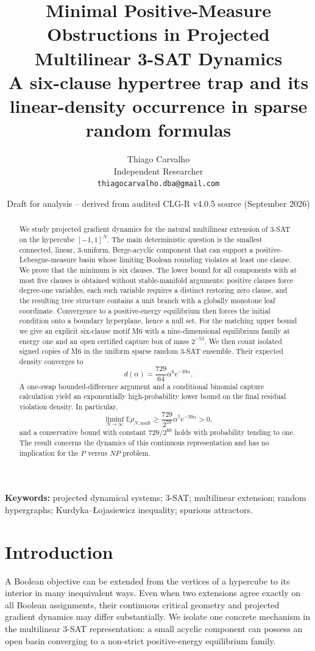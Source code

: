 \documentclass[11pt,a4paper]{article}
\title{Minimal Positive-Measure Obstructions in Projected Multilinear 3-SAT Dynamics\\\large A six-clause hypertree trap and its linear-density occurrence in sparse random formulas}
\author{Thiago Carvalho\\Independent Researcher\\\texttt{thiagocarvalho.dba@gmail.com}}
\date{Draft for analysis -- derived from audited CLG-R v4.0.5 source (September 2026)}
\begin{document}
\maketitle
\begin{abstract}
We study projected gradient dynamics for the natural multilinear extension of 3-SAT on the hypercube $[-1,1]^N$. The main deterministic question is the smallest connected, linear, 3-uniform, Berge-acyclic component that can support a positive-Lebesgue-measure basin whose limiting Boolean rounding violates at least one clause. We prove that the minimum is six clauses. The lower bound for all components with at most five clauses is obtained without stable-manifold arguments: positive clauses force degree-one variables, each such variable requires a distinct restoring zero clause, and the resulting tree structure contains a unit branch with a globally monotone leaf coordinate. Convergence to a positive-energy equilibrium then forces the initial condition onto a boundary hyperplane, hence a null set. For the matching upper bound we give an explicit six-clause motif M6 with a nine-dimensional equilibrium family at energy one and an open certified capture box of mass $2^{-53}$. We then count isolated signed copies of M6 in the uniform sparse random 3-SAT ensemble. Their expected density converges to
\[
d(\alpha)=\frac{729}{64}\alpha^6e^{-39\alpha}.
\]
A one-swap bounded-difference argument and a conditional binomial capture calculation yield an exponentially high-probability lower bound on the final residual violation density. In particular,
\[
\liminf_{N\to\infty}\mathbb E\rho_{N,\mathrm{mult}}\ge \frac{729}{2^{59}}\alpha^5e^{-39\alpha}>0,
\]
and a conservative bound with constant $729/2^{60}$ holds with probability tending to one. The result concerns the dynamics of this continuous representation and has no implication for the $P$ versus $NP$ problem.
\end{abstract}
\noindent\textbf{Keywords:} projected dynamical systems; 3-SAT; multilinear extension; random hypergraphs; Kurdyka--\L{}ojasiewicz inequality; spurious attractors.

\section{Introduction}
A Boolean objective can be extended from the vertices of a hypercube to its interior in many inequivalent ways. Even when two extensions agree exactly on all Boolean assignments, their continuous critical geometry and projected gradient dynamics may differ substantially. We isolate one concrete mechanism in the multilinear 3-SAT representation: a small acyclic component can possess an open basin converging to a non-strict positive-energy equilibrium family.
\end{document}
